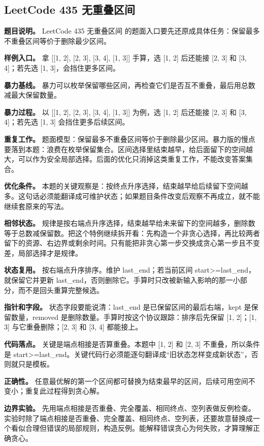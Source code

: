 \subsection{LeetCode 435 无重叠区间}

\textbf{题目说明。} LeetCode 435 无重叠区间 的题面入口要先还原成具体任务：保留最多不重叠区间等价于删除最少区间。

\textbf{样例入口。} 拿 [[1, 2], [2, 3], [3, 4], [1, 3]] 手算，选 [1, 2] 后还能接 [2, 3] 和 [3, 4]；若先选 [1, 3]，会挡住更多区间。

\textbf{暴力基线。} 暴力可以枚举保留哪些区间，再检查它们是否互不重叠，最后用总数减最大保留数量。

\textbf{暴力过程。} 以 [[1, 2], [2, 3], [3, 4], [1, 3]] 为例，选 [1, 2] 后还能接 [2, 3] 和 [3, 4]；若先选 [1, 3] 会挡住更多后续区间。

\textbf{重复工作。} 题面模型：保留最多不重叠区间等价于删除最少区间。暴力版的慢点要落到本题：浪费在枚举保留集合。区间选择里结束越早，给后面留下的空间越大，可以作为安全局部选择。后面的优化只消掉这类重复工作，不能改变答案集合。

\textbf{优化条件。} 本题的关键观察是：按终点升序选择，结束越早给后续留下空间越多。这句话必须能翻译成可维护状态；如果题目条件改变后观察不再成立，就不能继续套原来的写法。

\textbf{相邻状态。} 规律是按右端点升序选择，结束越早给未来留下的空间越多，删除数等于总数减保留数。把这个特例继续拆开看：先构造一个非贪心选择，再比较两者留下的资源、右边界或剩余时间。只有能把非贪心第一步交换成贪心第一步且不变差，局部选择才是规律。

\textbf{状态复用。} 按右端点升序排序。维护 last\_end；若当前区间 start>=last\_end，就保留它并更新 last\_end，否则删除它。手算时只改被新输入影响的那一小部分，而不是回头重算完整候选。

\textbf{指针和字段。} 状态字段要能说清：last\_end 是已保留区间的最后右端，kept 是保留数量，removed 是删除数量。手算时按这个协议跟踪：排序后先保留 [1, 2]；[1, 3] 与它重叠删除；[2, 3] 和 [3, 4] 都能接上。

\textbf{代码落点。} 关键是端点相接是否算重叠。本题中 [1, 2] 和 [2, 3] 不重叠，所以条件是 start>=last\_end。关键代码行必须能逐句翻译成“旧状态怎样变成新状态”，否则就只是模板。

\textbf{正确性。} 任意最优解的第一个区间都可替换为结束最早的区间，后续可用空间不变小；重复此过程得到贪心解。

\textbf{边界实验。} 先用端点相接是否重叠、完全覆盖、相同终点、空列表做反例检查。实验时除了端点相接是否重叠、完全覆盖、相同终点、空列表，还要故意替换成一个看似合理但错误的局部规则，构造反例。能解释错误贪心为何失败，才算理解正确贪心。

